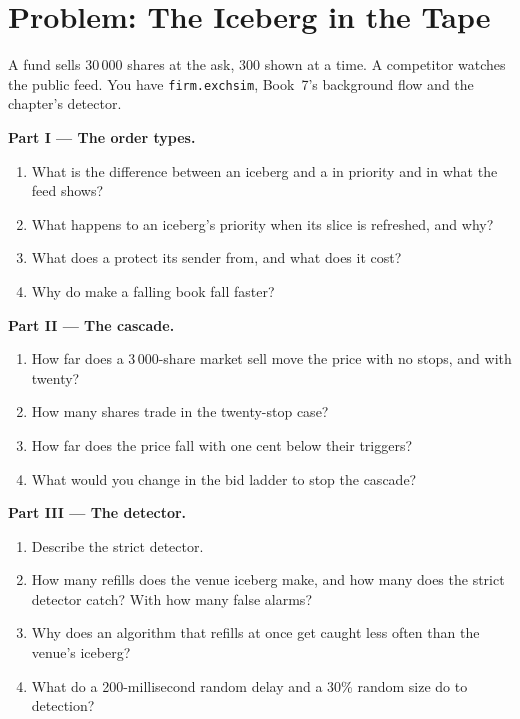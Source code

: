 \section{Problem: The Iceberg in the Tape}

\begin{problem}\label{pb:mx:order-types-and-their-uses:1}
A fund sells 30\,000 shares at the ask, 300 shown at a time. A competitor watches the public feed. You have \texttt{firm.exchsim}, Book~7's background
flow and the chapter's detector.

\medskip\noindent\textbf{Part I --- The order types.}
\begin{enumerate}
\item What is the difference between an iceberg and a  in priority and in what the feed shows?
\item What happens to an iceberg's priority when its slice is refreshed, and why?
\item What does a  protect its sender from, and what does it cost?
\item Why do  make a falling book fall faster?
\end{enumerate}

\medskip\noindent\textbf{Part II --- The cascade.}
\begin{enumerate}[resume]
\item How far does a 3\,000-share market sell move the price with no stops, and with twenty?
\item How many shares trade in the twenty-stop case?
\item How far does the price fall with  one cent below their triggers?
\item What would you change in the bid ladder to stop the cascade?
\end{enumerate}

\medskip\noindent\textbf{Part III --- The detector.}
\begin{enumerate}[resume]
\item Describe the strict detector.
\item How many refills does the venue iceberg make, and how many does the strict detector catch? With how many false alarms?
\item Why does an algorithm that refills at once get caught less often than the venue's iceberg?
\item What do a 200-millisecond random delay and a 30\% random size do to detection?
\end{enumerate}


\end{problem}
